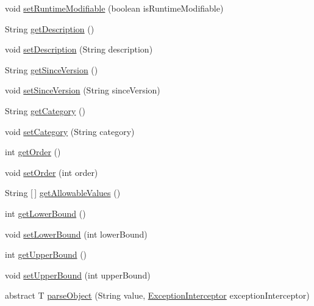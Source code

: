 \begin{DoxyCompactItemize}
\item 
void \mbox{\hyperlink{classcom_1_1mysql_1_1cj_1_1conf_1_1_abstract_property_definition_a1ae576395ef360eea939a702b045d353}{set\+Runtime\+Modifiable}} (boolean is\+Runtime\+Modifiable)
\item 
String \mbox{\hyperlink{classcom_1_1mysql_1_1cj_1_1conf_1_1_abstract_property_definition_af4a34d8afb26e311ff0f2290d9189bb5}{get\+Description}} ()
\item 
void \mbox{\hyperlink{classcom_1_1mysql_1_1cj_1_1conf_1_1_abstract_property_definition_a4b9d84be3fb1eac5d42707c405397eb9}{set\+Description}} (String description)
\item 
String \mbox{\hyperlink{classcom_1_1mysql_1_1cj_1_1conf_1_1_abstract_property_definition_a7f8ad00dc040a63ca6ec46ebda863a1d}{get\+Since\+Version}} ()
\item 
void \mbox{\hyperlink{classcom_1_1mysql_1_1cj_1_1conf_1_1_abstract_property_definition_a14aedd7c097260f02b59a8f6cbec5d01}{set\+Since\+Version}} (String since\+Version)
\item 
String \mbox{\hyperlink{classcom_1_1mysql_1_1cj_1_1conf_1_1_abstract_property_definition_a42152845862ecc58cab2f76ff8359e5c}{get\+Category}} ()
\item 
void \mbox{\hyperlink{classcom_1_1mysql_1_1cj_1_1conf_1_1_abstract_property_definition_ae03fd77dd1ceb3cab75d1306509d277f}{set\+Category}} (String category)
\item 
int \mbox{\hyperlink{classcom_1_1mysql_1_1cj_1_1conf_1_1_abstract_property_definition_ace6e9092bf122ffc61f14b1893cb2d22}{get\+Order}} ()
\item 
void \mbox{\hyperlink{classcom_1_1mysql_1_1cj_1_1conf_1_1_abstract_property_definition_ad98ad4ff5fbf672f211c9437a6d13e51}{set\+Order}} (int order)
\item 
String \mbox{[}$\,$\mbox{]} \mbox{\hyperlink{classcom_1_1mysql_1_1cj_1_1conf_1_1_abstract_property_definition_a3dc8d82d1870d9a7ad201b6552f77610}{get\+Allowable\+Values}} ()
\item 
int \mbox{\hyperlink{classcom_1_1mysql_1_1cj_1_1conf_1_1_abstract_property_definition_a834649a1010def340ecfda489b8e4c86}{get\+Lower\+Bound}} ()
\item 
void \mbox{\hyperlink{classcom_1_1mysql_1_1cj_1_1conf_1_1_abstract_property_definition_a95fd17b674eed162f64c336c6cdf9474}{set\+Lower\+Bound}} (int lower\+Bound)
\item 
int \mbox{\hyperlink{classcom_1_1mysql_1_1cj_1_1conf_1_1_abstract_property_definition_ad5fda7a2939d0525ae139dcb9489a100}{get\+Upper\+Bound}} ()
\item 
void \mbox{\hyperlink{classcom_1_1mysql_1_1cj_1_1conf_1_1_abstract_property_definition_ab4baaef262eb2d3218853f84be8ce87b}{set\+Upper\+Bound}} (int upper\+Bound)
\item 
abstract T \mbox{\hyperlink{classcom_1_1mysql_1_1cj_1_1conf_1_1_abstract_property_definition_aa8a990e4882d80051332cacda3886747}{parse\+Object}} (String value, \mbox{\hyperlink{interfacecom_1_1mysql_1_1cj_1_1exceptions_1_1_exception_interceptor}{Exception\+Interceptor}} exception\+Interceptor)
\end{DoxyCompactItemize}



